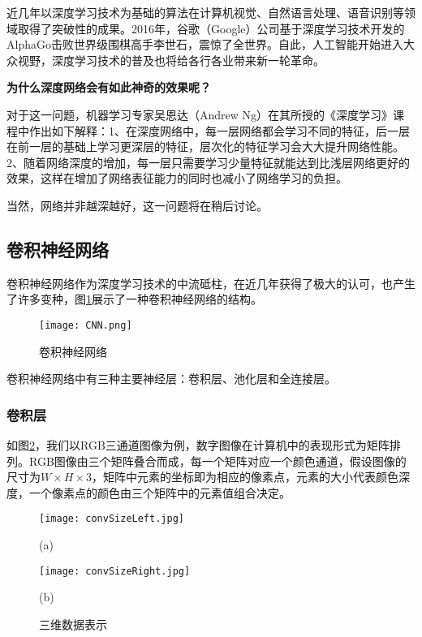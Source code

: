 \documentclass[bwprint]{cumcmthesis}
\begin{document}
近几年以深度学习技术为基础的算法在计算机视觉、自然语言处理、语音识别等领域取得了突破性的成果。2016年，谷歌（Google）公司基于深度学习技术开发的AlphaGo\cite{silver2016AlphaGo}击败世界级围棋高手李世石，震惊了全世界。自此，人工智能开始进入大众视野，深度学习技术的普及也将给各行各业带来新一轮革命。

\textbf{为什么深度网络会有如此神奇的效果呢？}

对于这一问题，机器学习专家吴恩达（Andrew Ng）在其所授的《深度学习》课程\cite{deeplearning}中作出如下解释：1、在深度网络中，每一层网络都会学习不同的特征，后一层在前一层的基础上学习更深层的特征，层次化的特征学习会大大提升网络性能。2、随着网络深度的增加，每一层只需要学习少量特征就能达到比浅层网络更好的效果，这样在增加了网络表征能力的同时也减小了网络学习的负担。

当然，网络并非越深越好，这一问题将在稍后讨论。


\subsection{卷积神经网络}

卷积神经网络作为深度学习技术的中流砥柱，在近几年获得了极大的认可，也产生了许多变种，图\ref{CNN}展示了一种卷积神经网络的结构。

\begin{figure}[!h]
	\centering
	\texttt{[image: CNN.png]}
	\caption{卷积神经网络\cite{cs231n}}
	\label{CNN}
\end{figure}


卷积神经网络中有三种主要神经层：卷积层、池化层和全连接层\cite{cs231n}。

\subsubsection{卷积层}

如图\ref{3DTensor}，我们以RGB三通道图像为例，数字图像在计算机中的表现形式为矩阵排列。RGB图像由三个矩阵叠合而成，每一个矩阵对应一个颜色通道，假设图像的尺寸为$W\times H\times 3$，矩阵中元素的坐标即为相应的像素点，元素的大小代表颜色深度，一个像素点的颜色由三个矩阵中的元素值组合决定。

\begin{figure}[!htp]  
	\begin{minipage}[t]{0.6\linewidth}%
		\centering  
		\texttt{[image: convSizeLeft.jpg]}  
		\caption*{(a)}%
	\end{minipage}  
	\begin{minipage}[t]{0.4\linewidth}%
		\centering  
		\texttt{[image: convSizeRight.jpg]}  
		\caption*{(b)} 
	\end{minipage}  
	\caption{三维数据表示\cite{cs231n}}%
	\label{3DTensor}
\end{figure}  
\end{document}
